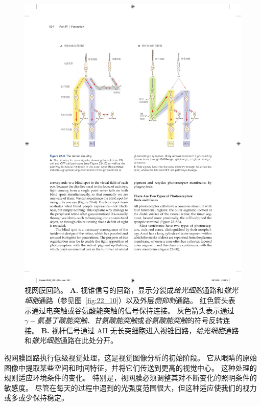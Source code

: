 \begin{figure}[htbp]
	\centering
	\includegraphics[width=1.0\linewidth]{chap22/fig_22_3}
	\caption{视网膜回路。
		\textbf{A.} 视锥信号的回路，显示分裂成\textit{给光细胞}通路和\textit{撤光细胞}通路（参见图~\ref{fig:22_10}）以及外层\textit{侧抑制}通路。
		红色箭头表示通过电突触或谷氨酸能突触的信号保持连接。
		灰色箭头表示通过\textit{$\gamma-$氨基丁酸能突触}、\textit{甘氨酸能突触}或\textit{谷氨酸能突触}的符号反转连接。
		\textbf{B.} 视杆信号通过 AII 无长突细胞进入视锥回路，\textit{给光细胞}通路和\textit{撤光细胞}通路在此处分开。}
	\label{fig:22_3}
\end{figure}


视网膜回路执行低级视觉处理，这是视觉图像分析的初始阶段。
它从眼睛的原始图像中提取某些空间和时间特征，并将它们传送到更高的视觉中心。
这种处理的规则适应环境条件的变化。
特别是，视网膜必须调整其对不断变化的照明条件的敏感度。
尽管在每天的过程中遇到的光强度范围很大，但这种适应使我们的视力或多或少保持稳定。


